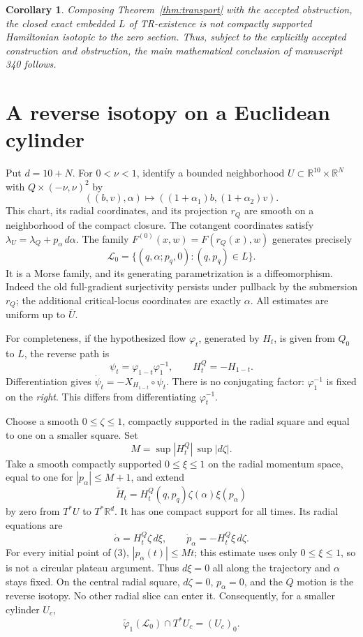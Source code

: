\documentclass[11pt]{article}
\newtheorem{corollary}[theorem]{Corollary}
\newcommand{\R}{\mathbb R}
\begin{document}
\begin{corollary}\label{cor:main}
Composing Theorem~\ref{thm:transport} with the accepted obstruction,
the closed exact embedded \(L\) of TR-existence is not compactly
supported Hamiltonian isotopic to the zero section.
Thus, subject to the explicitly accepted construction and obstruction,
the main mathematical conclusion of manuscript 340 follows.
\end{corollary}

\section{A reverse isotopy on a Euclidean cylinder}

Put \(d=10+N\). For \(0<\nu<1\), identify a bounded neighborhood
\(U\subset\R^{10}\times\R^N\) with \(Q\times(-\nu,\nu)^2\) by
\[
 ((b,v),\alpha)\longmapsto ((1+\alpha_1)b,(1+\alpha_2)v).
\]
This chart, its radial coordinates, and its projection \(r_Q\)
are smooth on a neighborhood of the compact closure.
The cotangent coordinates satisfy
\(\lambda_U=\lambda_Q+p_\alpha\,d\alpha\).
The family \(F^{(0)}(x,w)=F(r_Q(x),w)\) generates precisely
\[
 \mathcal L_0=\{(q,\alpha;p_q,0):(q,p_q)\in L\}.
 \tag{3}
\]
It is a Morse family, and its generating parametrization is a
diffeomorphism. Indeed the old full-gradient surjectivity persists
under pullback by the submersion \(r_Q\); the additional critical-locus
coordinates are exactly \(\alpha\).
All estimates are uniform up to \(\overline U\).

For completeness, if the hypothesized flow \(\varphi_t\), generated
by \(H_t\), is given from \(Q_0\) to \(L\), the reverse path is
\[
 \psi_t=\varphi_{1-t}\varphi_1^{-1},\qquad H_t^Q=-H_{1-t}.
 \tag{4}
\]
Differentiation gives
\(\dot\psi_t=-X_{H_{1-t}}\circ\psi_t\).
There is no conjugating factor: \(\varphi_1^{-1}\) is fixed on the
\emph{right}. This differs from differentiating \(\varphi_t^{-1}\).

Choose a smooth \(0\leq\zeta\leq1\), compactly supported in the
radial square and equal to one on a smaller square.
Set
\[
 M=\sup|H_t^Q|\,\sup|d\zeta|.
\]
Take a smooth compactly supported \(0\leq\xi\leq1\) on the radial
momentum space, equal to one for \(|p_\alpha|\leq M+1\), and extend
\[
 \widetilde H_t=H_t^Q(q,p_q)\zeta(\alpha)\xi(p_\alpha)
 \tag{5}
\]
by zero from \(T^*U\) to \(T^*\R^d\).
It has one compact support for all times. Its radial equations are
\[
 \dot\alpha=H_t^Q\zeta\,d\xi,\qquad
 \dot p_\alpha=-H_t^Q\xi\,d\zeta.
 \tag{6}
\]
For every initial point of (3), \(|p_\alpha(t)|\leq Mt\);
this estimate uses only \(0\leq\xi\leq1\), so is not a circular
plateau argument. Thus \(d\xi=0\) all along the trajectory and
\(\alpha\) stays fixed. On the central radial square,
\(d\zeta=0\), \(p_\alpha=0\), and the \(Q\) motion is the reverse
isotopy. No other radial slice can enter it. Consequently, for
a smaller cylinder \(U_c\),
\[
 \widetilde\varphi_1(\mathcal L_0)\cap T^*U_c=(U_c)_0.
 \tag{7}
\]
\end{document}

